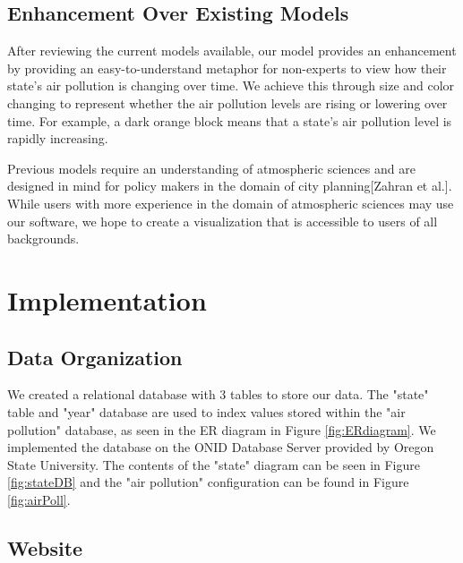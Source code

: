 \documentclass[journal]{vgtc}                %
\begin{document}
\subsection{Enhancement Over Existing Models}

After reviewing the current models available, our model provides an enhancement by providing an easy-to-understand
metaphor for non-experts to view how their state's air pollution is changing over time. We achieve this through size
and color changing to represent whether the air pollution levels are rising or lowering over time. For example, a dark
orange block means that a state's air pollution level is rapidly increasing.

Previous models require an understanding of atmospheric sciences and are designed in mind for policy makers in the domain
of city planning[Zahran et al.]. While users with more experience in the domain of atmospheric sciences may use our
software, we hope to create a visualization that is accessible to users of all backgrounds.

\section{Implementation}

\subsection{Data Organization}
We created a relational database with 3 tables to store our data. The "state" table and "year" database are used to
index values stored within the "air pollution" database, as seen in the ER diagram in Figure \ref{fig:ERdiagram}.
We implemented the database on the ONID Database Server provided by Oregon State University. The contents
of the "state" diagram can be seen in Figure \ref{fig:stateDB} and the "air pollution" configuration can be found in 
Figure \ref{fig:airPoll}.

\subsection{Website}
\end{document}
